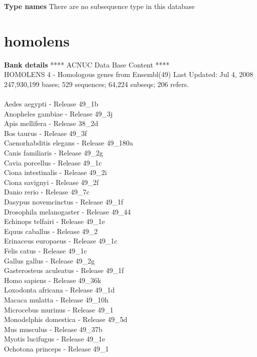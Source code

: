 \documentclass{article}
\begin{document}
\begin{Schunk}
\textbf{Type names}
There are no subsequence type in this database
\section{ homolens }
\textbf{Bank details}
             ****     ACNUC Data Base Content      ****\\
   HOMOLENS 4 - Homologous genes from Ensembl(49)	 Last Updated: Jul  4, 2008\\
247,930,199 bases; 529 sequences; 64,224 subseqs; 206 refers.\\
\\
 Aedes aegypti - Release 49\_1b \\
 Anopheles gambiae - Release 49\_3j \\
 Apis mellifera - Release 38\_2d \\
 Bos taurus - Release 49\_3f \\
 Caenorhabditis elegans - Release 49\_180a \\
 Canis familiaris - Release 49\_2g \\
 Cavia porcellus - Release 49\_1c \\
 Ciona intestinalis - Release 49\_2i \\
 Ciona savignyi - Release 49\_2f \\
 Danio rerio - Release 49\_7c \\
 Dasypus novemcinctus - Release 49\_1f \\
 Drosophila melanogaster - Release 49\_44 \\
 Echinops telfairi - Release 49\_1e \\
 Equus caballus - Release 49\_2 \\
 Erinaceus europaeus - Release 49\_1c \\
 Felis catus - Release 49\_1c \\
 Gallus gallus - Release 49\_2g \\
 Gasterosteus aculeatus - Release 49\_1f \\
 Homo sapiens - Release 49\_36k \\
 Loxodonta africana - Release 49\_1d \\
 Macaca mulatta - Release 49\_10h \\
 Microcebus murinus - Release 49\_1 \\
 Monodelphis domestica - Release 49\_5d \\
 Mus musculus - Release 49\_37b \\
 Myotis lucifugus - Release 49\_1e \\
 Ochotona princeps - Release 49\_1 \\

\end{Schunk}
\end{document}
